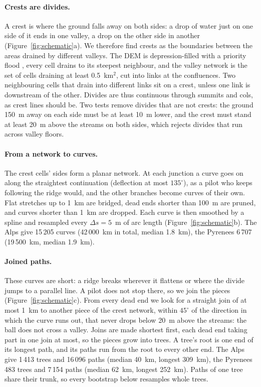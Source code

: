 \documentclass[11pt,a4paper]{article}
\begin{document}
\paragraph{Crests are divides.}
A crest is where the ground falls away on both sides: a drop of water just
on one side of it ends in one valley, a drop on the other side in another
(Figure~\ref{fig:schematic}a). We therefore find crests as the boundaries
between the areas drained by different valleys. The DEM is depression-filled
with a priority flood \citep{barnes2014}, every cell drains to its steepest
neighbour, and the valley network is the set of cells draining at least
0.5~km$^2$, cut into links at the confluences. Two neighbouring cells that
drain into different links sit on a crest, unless one link is downstream of
the other. Divides are thus continuous through summits and cols, as crest
lines should be. Two tests remove divides that are not crests: the ground
150~m away on each side must be at least 10~m lower, and the crest must stand
at least 20~m above the streams on both sides, which rejects divides that run
across valley floors.

\paragraph{From a network to curves.}
The crest cells' sides form a planar network. At each junction a curve goes on
along the straightest continuation (deflection at most $135^\circ$), as a pilot
who keeps following the ridge would, and the other branches become curves of
their own. Flat stretches up to 1~km are bridged, dead ends shorter than 100~m
are pruned, and curves shorter than 1~km are dropped. Each curve is then
smoothed by a spline and resampled every $\Delta s = 5$~m of arc length
(Figure~\ref{fig:schematic}b). The Alps give 15\,205 curves (42\,000~km in
total, median 1.8~km), the Pyrenees 6\,707 (19\,500~km, median 1.9~km).

\paragraph{Joined paths.}
These curves are short: a ridge breaks wherever it flattens or where the
divide jumps to a parallel line. A pilot does not stop there, so we join the
pieces (Figure~\ref{fig:schematic}c). From every dead end we look for a
straight join of at most 1~km to another piece of the crest network, within
$45^\circ$ of the direction in which the curve runs out, that never drops
below 20~m above the streams: the ball does not cross a valley. Joins are made
shortest first, each dead end taking part in one join at most, so the pieces
grow into trees. A tree's root is one end of its longest path, and its paths
run from the root to every other end. The Alps give 1\,413 trees and 16\,096
paths (median 40~km, longest 309~km), the Pyrenees 483 trees and 7\,154 paths
(median 62~km, longest 252~km). Paths of one tree share their trunk, so every
bootstrap below resamples whole trees.
\end{document}
